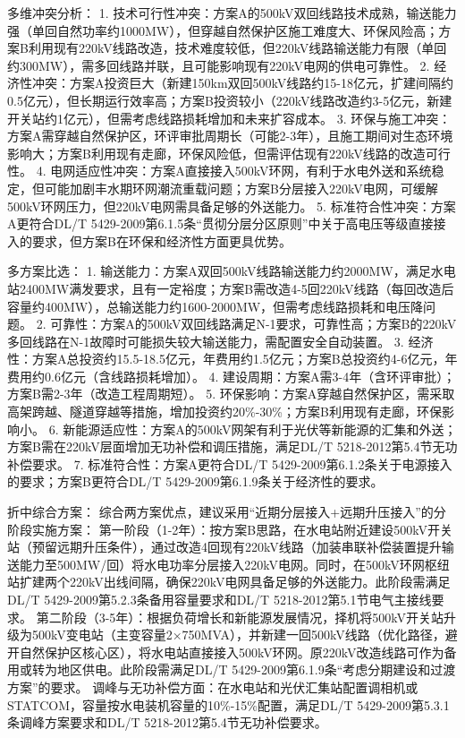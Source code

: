 \documentclass[12pt,a4paper]{ctexart}
\begin{document}
\begin{description}[leftmargin=1.5em,style=nextline,font=\normalfont]
多维冲突分析：
1. 技术可行性冲突：方案A的500kV双回线路技术成熟，输送能力强（单回自然功率约1000MW），但穿越自然保护区施工难度大、环保风险高；方案B利用现有220kV线路改造，技术难度较低，但220kV线路输送能力有限（单回约300MW），需多回线路并联，且可能影响现有220kV电网的供电可靠性。
2. 经济性冲突：方案A投资巨大（新建150km双回500kV线路约15-18亿元，扩建间隔约0.5亿元），但长期运行效率高；方案B投资较小（220kV线路改造约3-5亿元，新建开关站约1亿元），但需考虑线路损耗增加和未来扩容成本。
3. 环保与施工冲突：方案A需穿越自然保护区，环评审批周期长（可能2-3年），且施工期间对生态环境影响大；方案B利用现有走廊，环保风险低，但需评估现有220kV线路的改造可行性。
4. 电网适应性冲突：方案A直接接入500kV环网，有利于水电外送和系统稳定，但可能加剧丰水期环网潮流重载问题；方案B分层接入220kV电网，可缓解500kV环网压力，但220kV电网需具备足够的外送能力。
5. 标准符合性冲突：方案A更符合DL/T 5429-2009第6.1.5条“贯彻分层分区原则”中关于高电压等级直接接入的要求，但方案B在环保和经济性方面更具优势。

多方案比选：
1. 输送能力：方案A双回500kV线路输送能力约2000MW，满足水电站2400MW满发要求，且有一定裕度；方案B需改造4-5回220kV线路（每回改造后容量约400MW），总输送能力约1600-2000MW，但需考虑线路损耗和电压降问题。
2. 可靠性：方案A的500kV双回线路满足N-1要求，可靠性高；方案B的220kV多回线路在N-1故障时可能损失较大输送能力，需配置安全自动装置。
3. 经济性：方案A总投资约15.5-18.5亿元，年费用约1.5亿元；方案B总投资约4-6亿元，年费用约0.6亿元（含线路损耗增加）。
4. 建设周期：方案A需3-4年（含环评审批）；方案B需2-3年（改造工程周期短）。
5. 环保影响：方案A穿越自然保护区，需采取高架跨越、隧道穿越等措施，增加投资约20\%-30\%；方案B利用现有走廊，环保影响小。
6. 新能源适应性：方案A的500kV网架有利于光伏等新能源的汇集和外送；方案B需在220kV层面增加无功补偿和调压措施，满足DL/T 5218-2012第5.4节无功补偿要求。
7. 标准符合性：方案A更符合DL/T 5429-2009第6.1.2条关于电源接入的要求；方案B更符合DL/T 5429-2009第6.1.9条关于经济性的要求。

折中综合方案：
综合两方案优点，建议采用“近期分层接入+远期升压接入”的分阶段实施方案：
第一阶段（1-2年）：按方案B思路，在水电站附近建设500kV开关站（预留远期升压条件），通过改造4回现有220kV线路（加装串联补偿装置提升输送能力至500MW/回）将水电功率分层接入220kV电网。同时，在500kV环网枢纽站扩建两个220kV出线间隔，确保220kV电网具备足够的外送能力。此阶段需满足DL/T 5429-2009第5.2.3条备用容量要求和DL/T 5218-2012第5.1节电气主接线要求。
第二阶段（3-5年）：根据负荷增长和新能源发展情况，择机将500kV开关站升级为500kV变电站（主变容量2×750MVA），并新建一回500kV线路（优化路径，避开自然保护区核心区），将水电站直接接入500kV环网。原220kV改造线路可作为备用或转为地区供电。此阶段需满足DL/T 5429-2009第6.1.9条“考虑分期建设和过渡方案”的要求。
调峰与无功补偿方面：在水电站和光伏汇集站配置调相机或STATCOM，容量按水电装机容量的10\%-15\%配置，满足DL/T 5429-2009第5.3.1条调峰方案要求和DL/T 5218-2012第5.4节无功补偿要求。


\end{description}
\end{document}
